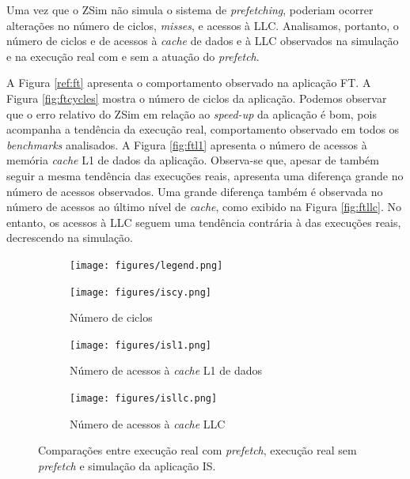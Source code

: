 \documentclass[12pt]{article}
\begin{document}
\vspace{-1mm}
Uma vez que o ZSim não simula o sistema de \textit{prefetching}, poderiam ocorrer alterações no número de ciclos, \textit{misses}, e acessos à LLC.
Analisamos, portanto, o número de ciclos e de acessos à \textit{cache} de dados e à LLC observados na simulação e na execução real com e sem a atuação do \textit{prefetch}. 

\vspace{-2mm}
A Figura \ref{ref:ft} apresenta o comportamento observado na aplicação FT.
A Figura \ref{fig:ftcycles} mostra o número de ciclos da aplicação.
Podemos observar que o erro relativo do ZSim em relação ao \emph{speed-up} da aplicação é bom, pois acompanha a tendência da execução real, comportamento observado em todos os \textit{benchmarks} analisados.
A Figura \ref{fig:ftl1} apresenta o número de acessos à memória \textit{cache} L1 de dados da aplicação.
Observa-se que, apesar de também seguir a mesma tendência das execuções reais, apresenta uma diferença grande no número de acessos observados.
Uma grande diferença também é observada no número de acessos ao último nível de \textit{cache}, como exibido na Figura \ref{fig:ftllc}.
No entanto, os acessos à LLC seguem uma tendência contrária à das execuções reais, decrescendo na simulação.




\begin{figure}[t!]
  \hspace{+25mm}
  \begin{subfigure}{0.33\textwidth}
    \centering
        \texttt{[image: figures/legend.png]}
    \label{fig:isleg}
  \end{subfigure}
  \vspace{-5mm}

  \begin{subfigure}{0.33\textwidth}
    \centering
    \vspace{-4mm}
        \texttt{[image: figures/iscy.png]}
    \caption{Número de ciclos}
    \label{fig:iscycles}
  \end{subfigure}%
  \begin{subfigure}{0.33\textwidth}
    \centering	
        \texttt{[image: figures/isl1.png]}
    \caption{Número de acessos à \textit{cache} L1 de dados}
    \label{fig:isl1}
  \end{subfigure}%
  \begin{subfigure}{0.33\textwidth}
    \centering	
        \texttt{[image: figures/isllc.png]}
    \caption{Número de acessos à \textit{cache} LLC}
    \label{fig:isllc}
  \end{subfigure}
  
  \caption{Comparações entre execução real com \textit{prefetch}, execução real sem \textit{prefetch} e simulação da aplicação IS.}
  \label{ref:is}
\end{figure}
\end{document}
